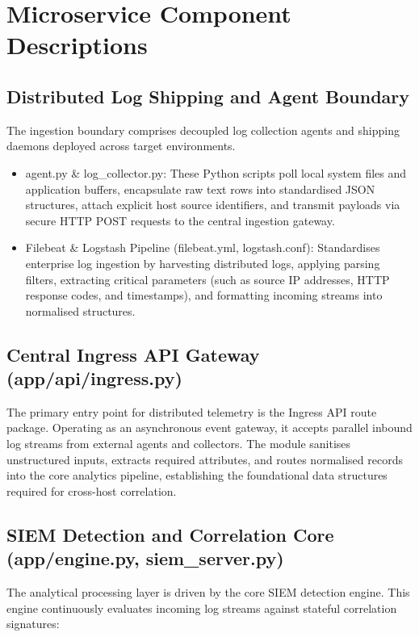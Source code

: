 \section{Microservice Component Descriptions}

\subsection{Distributed Log Shipping and Agent Boundary}

The ingestion boundary comprises decoupled log collection agents and shipping daemons deployed across target environments.

\begin{itemize}
  \item agent.py \& log\_collector.py: These Python scripts poll local system files and application buffers, encapsulate raw text rows into standardised JSON structures, attach explicit host source identifiers, and transmit payloads via secure HTTP POST requests to the central ingestion gateway.
  \item Filebeat \& Logstash Pipeline (filebeat.yml, logstash.conf): Standardises enterprise log ingestion by harvesting distributed logs, applying parsing filters, extracting critical parameters (such as source IP addresses, HTTP response codes, and timestamps), and formatting incoming streams into normalised structures.
\end{itemize}

\subsection{Central Ingress API Gateway (app/api/ingress.py)}

The primary entry point for distributed telemetry is the Ingress API route package. Operating as an asynchronous event gateway, it accepts parallel inbound log streams from external agents and collectors. The module sanitises unstructured inputs, extracts required attributes, and routes normalised records into the core analytics pipeline, establishing the foundational data structures required for cross-host correlation.

\subsection{SIEM Detection and Correlation Core (app/engine.py, siem\_server.py)}

The analytical processing layer is driven by the core SIEM detection engine. This engine continuously evaluates incoming log streams against stateful correlation signatures:

